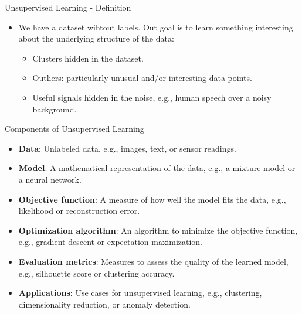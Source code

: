 \begin{frame}[allowframebreaks]{Unsupervised Learning - Definition}
\begin{itemize}
    \item We have a dataset wihtout labels. Out goal is to learn something interesting about the underlying structure of the data:
    \begin{itemize}
        \item Clusters hidden in the dataset.
        \item Outliers: particularly unusual and/or interesting data points.
        \item Useful signals hidden in the noise, e.g., human speech over a noisy background.
    \end{itemize}
\end{itemize}
\end{frame}

\begin{frame}[allowframebreaks]{Components of Unsupervised Learning}
\begin{itemize}
    \item \textbf{Data}: Unlabeled data, e.g., images, text, or sensor readings.
    \item \textbf{Model}: A mathematical representation of the data, e.g., a mixture model or a neural network.
    \item \textbf{Objective function}: A measure of how well the model fits the data, e.g., likelihood or reconstruction error.
    \item \textbf{Optimization algorithm}: An algorithm to minimize the objective function, e.g., gradient descent or expectation-maximization.
    \item \textbf{Evaluation metrics}: Measures to assess the quality of the learned model, e.g., silhouette score or clustering accuracy.
    \item \textbf{Applications}: Use cases for unsupervised learning, e.g., clustering, dimensionality reduction, or anomaly detection.
\end{itemize}
\end{frame}

